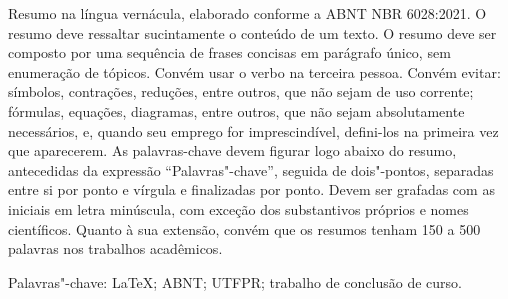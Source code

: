Resumo na língua vernácula, elaborado conforme a ABNT NBR 6028:2021. O resumo deve ressaltar sucintamente o conteúdo de um texto. O resumo deve ser composto por uma sequência de frases concisas em parágrafo único, sem enumeração de tópicos. Convém usar o verbo na terceira pessoa. Convém evitar: símbolos, contrações, reduções, entre outros, que não sejam de uso corrente; fórmulas, equações, diagramas, entre outros, que não sejam absolutamente necessários, e, quando seu emprego for imprescindível, defini-los na primeira vez que aparecerem. As palavras-chave devem figurar logo abaixo do resumo, antecedidas da expressão \enquote{Palavras"-chave}, seguida de dois"-pontos, separadas entre si por ponto e vírgula e finalizadas por ponto. Devem ser grafadas com as iniciais em letra minúscula, com exceção dos substantivos próprios e nomes científicos. Quanto à sua extensão, convém que os resumos tenham 150 a 500 palavras nos trabalhos acadêmicos.

\vspace{\onelineskip}
\noindent Palavras"-chave: LaTeX; ABNT; UTFPR; trabalho de conclusão de curso.
